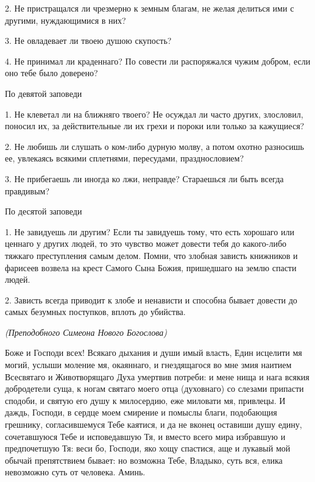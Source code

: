 2. Не пристращался ли чрезмерно к земным благам, не желая делиться ими с другими, нуждающимися в них?

3. Не овладевает ли твоею душою скупость?

4. Не принимал ли краденнаго? По совести ли распоряжался чужим добром, если оно тебе было доверено? 

\bfseries \itshape 

По девятой заповеди

\normalfont{}\normalfont{}1. Не клеветал ли на ближняго твоего? Не осуждал ли часто других, злословил, поносил их, за действительные ли их грехи и пороки или только за кажущиеся?

2. Не любишь ли слушать о ком-либо дурную молву, а потом охотно разносишь ее, увлекаясь всякими сплетнями, пересудами, празднословием?

3. Не прибегаешь ли иногда ко лжи, неправде? Стараешься ли быть всегда правдивым? 

\bfseries \itshape 

По десятой заповеди

\normalfont{}\normalfont{}1. Не завидуешь ли другим? Если ты завидуешь тому, что есть хорошаго или ценнаго у других людей, то это чувство может довести тебя до какого-либо тяжкаго преступления самым делом. Помни, что злобная зависть книжников и фарисеев возвела на крест Самого Сына Божия, пришедшаго на землю спасти людей.

2. Зависть всегда приводит к злобе и ненависти и способна бывает довести до самых безумных поступков, вплоть до убийства.





\bigskip\bigskip\mychapterending

 


\itshape (Преподобного Симеона Нового Богослова) 

\normalfont{}

Боже и Господи всех! Всякаго дыхания и души имый власть, Един исцелити мя могий, услыши моление мя, окаяннаго, и гнездящагося во мне змия наитием Всесвятаго и Животворящаго Духа умертвив потреби: и мене нища и нага всякия добродетели суща, к ногам святаго моего отца (духовнаго) со слезами припасти сподоби, и святую его душу к милосердию, еже миловати мя, привлецы. И даждь, Господи, в сердце моем смирение и помыслы благи, подобающия грешнику, согласившемуся Тебе каятися, и да не вконец оставиши душу едину, сочетавшуюся Тебе и исповедавшую Тя, и вместо всего мира избравшую и предпочетшую Тя: веси бо, Господи, яко хощу спастися, аще и лукавый мой обычай препятствием бывает: но возможна Тебе, Владыко, суть вся, елика невозможно суть от человека. Аминь. 


